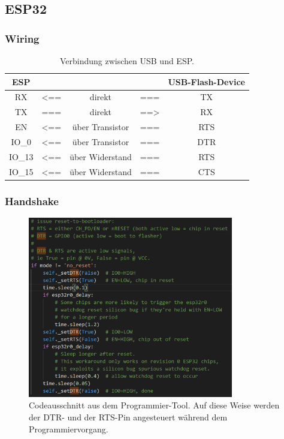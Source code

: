\subsection{ESP32}\label{Appendix:Handshake_ESP}

\subsubsection{Wiring}\label{Appendix:Handshake_ESP_wiring}
\begin{table}[H]
\center
\begin{tabular}{|c|lcl|c|}
\hline
\textbf{ESP} & & & & \textbf{USB-Flash-Device} \\ \hline
RX & <== & direkt & === & TX  \\
TX & === & direkt & ==> & RX  \\
EN & <== & über Transistor & === & RTS \\
IO\_0 & <== & über Transistor & === & DTR \\
IO\_13 & <== & über Widerstand & === & RTS \\
IO\_15 & <== & über Widerstand & === & CTS \\
\hline
\end{tabular}
\caption{Verbindung zwischen USB und ESP.}
\label{tab:USB_ESP}
\end{table}

\newpage

\subsubsection{Handshake}\label{Appendix:Handshake_ESP_Messung}

\begin{figure}[H]
	\centering
	\includegraphics[width=0.8\textwidth]{graphics/ESP32_Boot_Code}
	\caption{Codeausschnitt aus dem Programmier-Tool. Auf diese Weise werden der DTR- und der RTS-Pin angesteuert während dem Programmiervorgang.}
	\label{fig:ESP32_Boot_Code}
\end{figure}

